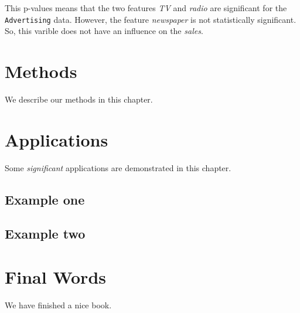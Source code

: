 \documentclass[]{book}
\begin{document}
This p-values means that the two features \emph{TV} and \emph{radio} are significant for the \texttt{Advertising} data. However, the feature \emph{newspaper} is not statistically significant. So, this varible does not have an influence on the \emph{sales}.

\hypertarget{methods}{%
\chapter{Methods}\label{methods}}

We describe our methods in this chapter.

\hypertarget{applications}{%
\chapter{Applications}\label{applications}}

Some \emph{significant} applications are demonstrated in this chapter.

\hypertarget{example-one}{%
\section{Example one}\label{example-one}}

\hypertarget{example-two}{%
\section{Example two}\label{example-two}}

\hypertarget{final-words}{%
\chapter{Final Words}\label{final-words}}

We have finished a nice book.


\end{document}
